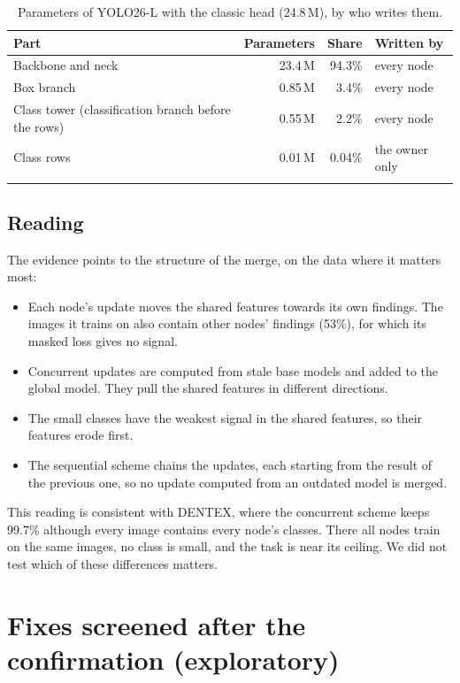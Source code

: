 \documentclass[pdflatex,sn-mathphys-num]{sn-jnl}
\begin{document}
\begin{table}[h]
\caption{Parameters of YOLO26-L with the classic head (24.8\,M), by who writes them.}\label{tab:s-params}
\footnotesize
\begin{tabular*}{\textwidth}{@{\extracolsep\fill}lrrl}
\toprule
Part & Parameters & Share & Written by \\
\midrule
Backbone and neck & 23.4\,M & 94.3\% & every node \\
Box branch & 0.85\,M & 3.4\% & every node \\
Class tower (classification branch before the rows) & 0.55\,M & 2.2\% & every node \\
Class rows & 0.01\,M & 0.04\% & the owner only \\
\botrule
\end{tabular*}
\end{table}

\subsection{Reading}
The evidence points to the structure of the merge, on the data where it matters most:
\begin{itemize}
\item Each node's update moves the shared features towards its own findings. The images it trains on also contain other nodes' findings (53\%), for which its masked loss gives no signal.
\item Concurrent updates are computed from stale base models and added to the global model. They pull the shared features in different directions.
\item The small classes have the weakest signal in the shared features, so their features erode first.
\item The sequential scheme chains the updates, each starting from the result of the previous one, so no update computed from an outdated model is merged.
\end{itemize}
This reading is consistent with DENTEX, where the concurrent scheme keeps 99.7\% although every image contains every node's classes. There all nodes train on the same images, no class is small, and the task is near its ceiling. We did not test which of these differences matters.

\section{Fixes screened after the confirmation (exploratory)}\label{sec:s-fixes}
\end{document}
